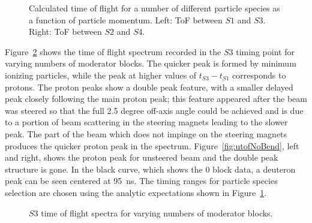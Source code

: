 \begin{figure}[ht]
  
  \begin{minipage}[t]{0.49\textwidth}
    \begin{adjustbox}{max totalsize={\textwidth}{.5\textheight},center}
      
    \end{adjustbox}
  \end{minipage}
  \hfill
  \begin{minipage}[t]{0.49\textwidth}
    \begin{adjustbox}{max totalsize={\textwidth}{.5\textheight},center}
      
    \end{adjustbox}
  \end{minipage}
   \caption{\label{fig:s1s3PredTimes}Calculated time of flight for a number of different particle species as a function of particle momentum. Left: ToF between $\mathit{S1}$ and $\mathit{S3}$. Right: ToF between $\mathit{S2}$ and $\mathit{S4}$.}
\end{figure}

Figure~\ref{fig:s3tof} shows the time of flight spectrum recorded in the $\mathit{S3}$ timing point for varying numbers of moderator blocks.
The quicker peak is formed by minimum ionizing particles, while the peak at higher values of $\mathit{t_{S3}} - \mathit{t_{S1}}$ corresponds to protons.
The proton peaks show a double peak feature, with a smaller delayed peak closely following the main proton peak; this feature appeared after the beam was steered so that the full 2.5 degree off-axis angle could be achieved and is due to a portion of beam scattering in the steering magnets leading to the slower peak.
The part of the beam which does not impinge on the steering magnets produces the quicker proton peak in the spectrum.
Figure~\ref{fig:utofNoBend}, left and right, shows the proton peak for unsteered beam and the double peak structure is gone.
In the black curve, which shows the 0 block data, a deuteron peak can be seen centered at 95~ns.
The timing ranges for particle species selection are chosen using the analytic expectations shown in Figure~\ref{fig:s1s3PredTimes}.

\begin{figure}[h]
  \begin{adjustbox}{max totalsize={.7\textwidth}{.5\textheight},center}
    
  \end{adjustbox}
  \caption{$\mathit{S3}$ time of flight spectra for varying numbers of moderator blocks.}
  \label{fig:s3tof}
\end{figure}


